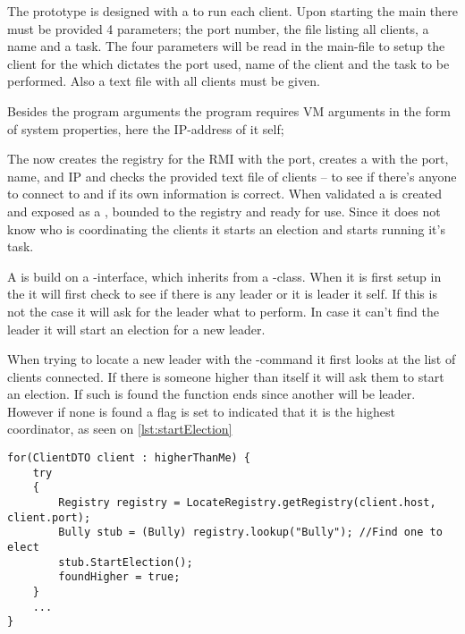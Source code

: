 \documentclass[Main]{subfiles}
\begin{document}
The prototype is designed with a  to run each client.
Upon starting the main there must be provided 4 parameters; the port number, the file listing all clients, a name and a task.
The four parameters will be read in the main-file to setup the client for the  which dictates the port used, name of the client and the task to be performed.
Also a text file with all clients must be given.

Besides the program arguments the program requires VM arguments in the form of system properties, here the IP-address of it self; 

The  now creates the registry for the RMI with the port, creates a  with the port, name, and IP and checks the provided text file of clients -- to see if there's anyone to connect to and if its own information is correct.
When validated a  is created and exposed as a , bounded to the registry and ready for use. 
Since it does not know who is coordinating the clients it starts an election and starts running it's task.



A  is build on a -interface, which inherits from a -class.
When it is first setup in the  it will first check to see if there is any leader or it is leader it self.
If this is not the case it will ask for the leader what to perform.
In case it can't find the leader it will start an election for a new leader.



When trying to locate a new leader with the -command it first looks at the list of clients connected. 
If there is someone higher than itself it will ask them to start an election.
If such is found the function ends since another will be leader.
However if none is found a flag is set to indicated that it is the highest coordinator, as seen on \codeTitle \ref{lst:startElection} 


\begin{lstlisting}[caption=Client: StartElection(), style=Code-Java, label=lst:startElection]
for(ClientDTO client : higherThanMe) {
	try 
	{
		Registry registry = LocateRegistry.getRegistry(client.host, client.port);
		Bully stub = (Bully) registry.lookup("Bully"); //Find one to elect
		stub.StartElection(); 
		foundHigher = true; 
	}
	...
}
\end{lstlisting}
\end{document}
